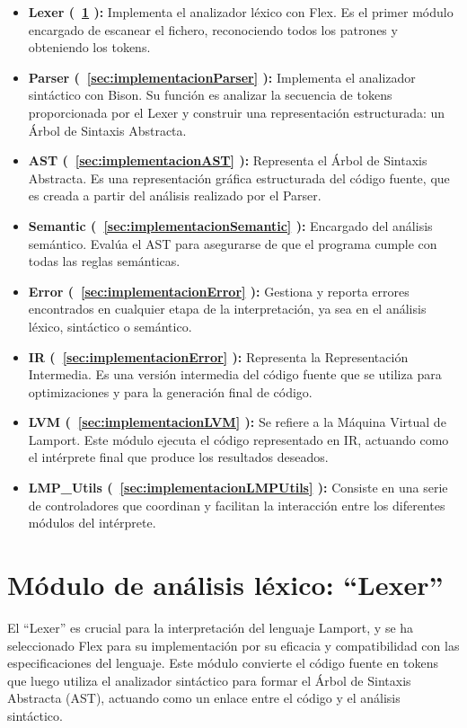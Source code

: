 \begin{itemize}
    \item \textbf{Lexer (~\ref{sec:implementacionLexer} ):} Implementa el analizador léxico con Flex. Es el primer módulo encargado de escanear el fichero, reconociendo todos los patrones y obteniendo los tokens.
    
    \item \textbf{Parser (~\ref{sec:implementacionParser} ):} Implementa el analizador sintáctico con Bison. Su función es analizar la secuencia de tokens proporcionada por el Lexer y construir una representación estructurada: un Árbol de Sintaxis Abstracta.
    
    \item \textbf{AST (~\ref{sec:implementacionAST} ):} Representa el Árbol de Sintaxis Abstracta. Es una representación gráfica estructurada del código fuente, que es creada a partir del análisis realizado por el Parser.
    
    \item \textbf{Semantic (~\ref{sec:implementacionSemantic} ):} Encargado del análisis semántico. Evalúa el AST para asegurarse de que el programa cumple con todas las reglas semánticas.
    
    \item \textbf{Error (~\ref{sec:implementacionError} ):} Gestiona y reporta errores encontrados en cualquier etapa de la interpretación, ya sea en el análisis léxico, sintáctico o semántico.
    
    \item \textbf{IR (~\ref{sec:implementacionError} ):} Representa la Representación Intermedia. Es una versión intermedia del código fuente que se utiliza para optimizaciones y para la generación final de código.
    
    \item \textbf{LVM (~\ref{sec:implementacionLVM} ):} Se refiere a la Máquina Virtual de Lamport. Este módulo ejecuta el código representado en IR, actuando como el intérprete final que produce los resultados deseados.
    
    \item \textbf{LMP\_Utils (~\ref{sec:implementacionLMPUtils} ):} Consiste en una serie de controladores que coordinan y facilitan la interacción entre los diferentes módulos del intérprete.
    
\end{itemize}

\section{Módulo de análisis léxico: ``Lexer''}\label{sec:implementacionLexer}
El ``Lexer'' es crucial para la interpretación del lenguaje Lamport, y se ha seleccionado Flex para su implementación por su eficacia y compatibilidad con las especificaciones del lenguaje. Este módulo convierte el código fuente en tokens que luego utiliza el analizador sintáctico para formar el Árbol de Sintaxis Abstracta (AST), actuando como un enlace entre el código y el análisis sintáctico.

